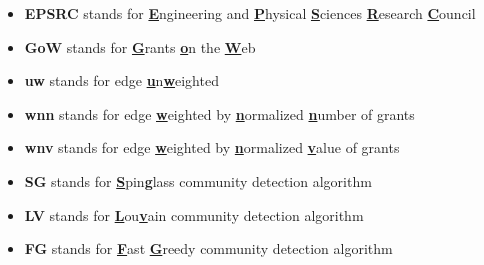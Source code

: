 \begin{itemize}[noitemsep]
    \item \textbf{EPSRC} stands for \underline{\textbf{E}}ngineering and \underline{\textbf{P}}hysical \underline{\textbf{S}}ciences \underline{\textbf{R}}esearch \underline{\textbf{C}}ouncil
    \item \textbf{GoW} stands for \underline{\textbf{G}}rants \underline{\textbf{o}}n the \underline{\textbf{W}}eb
    \vspace{1em}
    \item \textbf{uw} stands for edge \underline{\textbf{u}}n\underline{\textbf{w}}eighted
    \item \textbf{wnn} stands for edge \underline{\textbf{w}}eighted by \underline{\textbf{n}}ormalized \underline{\textbf{n}}umber of grants
    \item \textbf{wnv} stands for edge \underline{\textbf{w}}eighted by \underline{\textbf{n}}ormalized \underline{\textbf{v}}alue of grants
    \vspace{1em}
    \item \textbf{SG} stands for \underline{\textbf{S}}pin\underline{\textbf{g}}lass community detection algorithm
    \item \textbf{LV} stands for \underline{\textbf{L}}ou\underline{\textbf{v}}ain community detection algorithm
    \item \textbf{FG} stands for \underline{\textbf{F}}ast \underline{\textbf{G}}reedy community detection algorithm
\end{itemize}